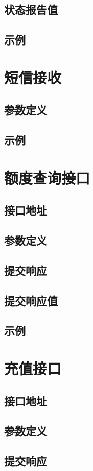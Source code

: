 \documentclass[11pt]{book} %
\begin{document}
\section{状态报告值}
\section{示例}
\chapter{短信接收}
\section{参数定义}
\section{示例}
\chapter{额度查询接口}
\section{接口地址}
\section{参数定义}
\section{提交响应}
\section{提交响应值}
\section{示例}
\chapter{充值接口}
\section{接口地址}
\section{参数定义}
\section{提交响应}
\end{document}
